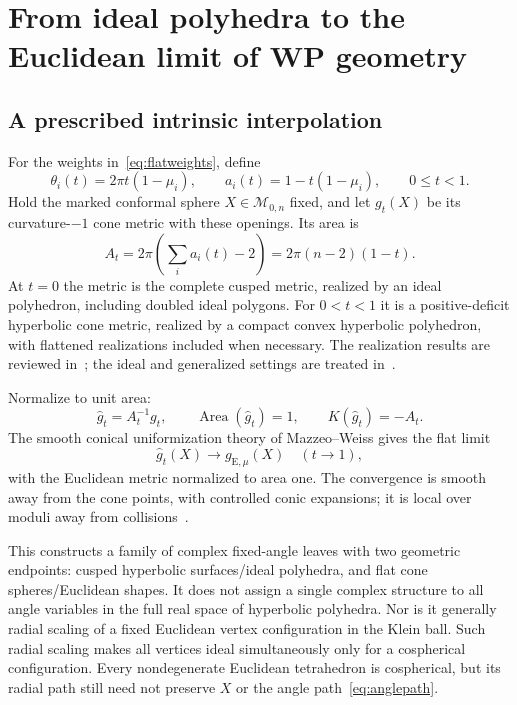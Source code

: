 \documentclass[11pt,a4paper]{article}
\numberwithin{equation}{section}
\theoremstyle{definition}
\theoremstyle{remark}
\newcommand{\M}{\mathcal M}
\begin{document}
\section{From ideal polyhedra to the Euclidean limit of WP geometry}
\label{sec:flatlimit}

\subsection{A prescribed intrinsic interpolation}

For the weights in~\eqref{eq:flatweights}, define
\begin{equation}
 \theta_i(t)=2\pi t(1-\mu_i),\qquad
 a_i(t)=1-t(1-\mu_i),\qquad 0\le t<1.
 \label{eq:anglepath}
\end{equation}
Hold the marked conformal sphere $X\in\M_{0,n}$ fixed, and let $g_t(X)$
be its curvature-$-1$ cone metric with these openings. Its area is
\begin{equation}
 A_t=2\pi\left(\sum_i a_i(t)-2\right)
    =2\pi(n-2)(1-t).
 \label{eq:areapath}
\end{equation}
At $t=0$ the metric is the complete cusped metric, realized by an ideal
polyhedron, including doubled ideal polygons. For $0<t<1$ it is a positive-deficit hyperbolic cone metric,
realized by a compact convex hyperbolic polyhedron, with flattened
realizations included when necessary. The realization results are
reviewed in~\cite{Fillastre}; the ideal and generalized settings are
treated in~\cite{RivinIntrinsic,Schlenker}.

Normalize to unit area:
\begin{equation}
 \widehat g_t=A_t^{-1}g_t,
 \qquad \operatorname{Area}(\widehat g_t)=1,
 \qquad K(\widehat g_t)=-A_t.
 \label{eq:unitareanormalization}
\end{equation}
The smooth conical uniformization theory of Mazzeo--Weiss gives the
flat limit
\begin{equation}
 \widehat g_t(X)\longrightarrow g_{\mathrm E,\mu}(X)
 \quad (t\to1),
 \label{eq:flatmetriclimit}
\end{equation}
with the Euclidean metric normalized to area one. The convergence is
smooth away from the cone points, with controlled conic expansions;
it is local over moduli away from collisions~\cite{MazzeoWeiss}.

This constructs a family of complex fixed-angle leaves with two
geometric endpoints: cusped hyperbolic surfaces/ideal polyhedra, and
flat cone spheres/Euclidean shapes. It does not assign a single
complex structure to all angle variables in the full real space of
hyperbolic polyhedra. Nor is it generally radial scaling of a fixed
Euclidean vertex configuration in the Klein ball. Such radial scaling
makes all vertices ideal simultaneously only for a cospherical
configuration. Every nondegenerate Euclidean tetrahedron is
cospherical, but its radial path still need not preserve $X$ or
the angle path~\eqref{eq:anglepath}.
\end{document}
